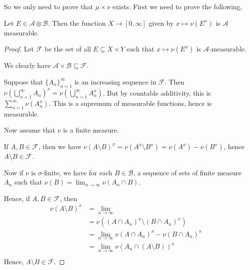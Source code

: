 \documentclass{owmaths}
\begin{document}
So we only need to prove that $\mu\times\nu$ exists. First we need to
prove the following,
\begin{lemma}
    Let $E \in \mathcal{A}\otimes\mathcal{B}$. Then the function $X\rightarrow [0,\infty]$
    given by $x\mapsto \nu(E^x)$ is $\mathcal{A}$ measurable.
\end{lemma}
\begin{proof}
    
    Let $\mathcal{F}$ be the set of all $E \subseteq X\times Y$ such that $x \mapsto \nu(E^x)$
    is $\mathcal{A}$-measurable. 
    
    We clearly have $\mathcal{A}\times\mathcal{B} \subseteq \mathcal{F}$.
    
    Suppose that $\{A_n\}_{n=1}^\infty$ is an increasing sequence in $\mathcal{F}$. Then $\nu\left(\bigcup_{n=1}^\infty A_n\right)^x = \nu\left(\bigcup_{n=1}^\infty A_n^x\right)$.
    But by countable additivity, this is $\sum_{n=1}^\infty \nu(A_n^x)$.
    This is a supremum of measurable functions, hence is measurable.
    
    Now assume that $\nu$ is a finite measure.
    
    If $A,B \in \mathcal{F}$, then we have $\nu(A\setminus B)^x = \nu(A^x\setminus B^x) = \nu(A^x) - \nu(B^x)$,
    hence $A \setminus B \in \mathcal{F}$.
    
    Now if $\nu$ is $\sigma$-finite, we have for each $B \in \mathcal{B}$, a sequence
    of sets of finite measure $A_n$ such that $\nu(B) = \lim_{n\rightarrow\infty} \nu(A_n\cap B)$. 
    
    Hence, if $A,B \in \mathcal{F}$, then
    \begin{align*}
        \nu(A\setminus B)^x &= \lim_{n\rightarrow\infty}\\
        &=  \nu((A\cap A_n)^x\setminus (B\cap A_n)^x)\\
         &= \lim_{n\rightarrow\infty} \nu(A\cap A_n)^x-\nu(B\cap A_n)^x\\
         &= \lim_{n\rightarrow\infty} \nu(A_n\cap(A\setminus B))^x\\
    \end{align*}
    Hence, $A\setminus B \in \mathcal{F}$.
    
\end{proof}
\end{document}
